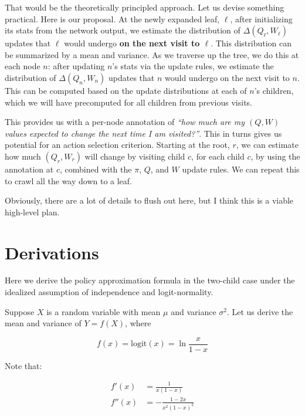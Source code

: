 \documentclass[tikz]{article}
\newcommand{\logit}{\mathrm{logit}}
\begin{document}
That would be the theoretically principled approach. Let us devise something practical. Here is our proposal. At the newly
expanded leaf, $\ell$, after initializing its stats from the network output, we estimate the distribution of $\Delta(Q_\ell, W_\ell)$
updates that $\ell$ would undergo \textbf{on the next visit to $\ell$}. This distribution can be summarized by a mean and variance.
As we traverse up the tree, we do this at each node $n$: after updating $n$'s stats via the update rules, we estimate the
distribution of $\Delta(Q_n, W_n)$ updates that $n$ would undergo on the next visit to $n$. This can be computed
based on the update distributions at each of $n$'s children, which we will have precomputed for all children from
previous visits. \newline

This provides us with a per-node annotation of \textit{``how much are my $(Q, W)$ values expected to change the next time I am visited?''}.
This in turns gives us potential for an action selection criterion. Starting at the root, $r$, we can estimate how much $(Q_r, W_r)$
will change by visiting child $c$, for each child $c$, by using the annotation at $c$, combined with the $\pi$, $Q$, and $W$
update rules. We can repeat this to crawl all the way down to a leaf. \newline

Obviously, there are a lot of details to flush out here, but I think this is a viable high-level plan.


\newpage
\appendix
\renewcommand{\thesection}{Appendix \Alph{section}} %

\section{Derivations}
\label{appendix-derivations}

Here we derive the policy approximation formula in the two-child case under the idealized assumption of independence and logit-normality. \newline

Suppose $X$ is a random variable with mean $\mu$ and variance $\sigma^2$. Let us derive the mean and variance of $Y = f(X)$, where

$$f(x) = \logit(x) = \ln{\frac{x}{1-x}}$$

Note that:

\begin{align*}
f'(x) &= \frac{1}{x(1-x)} \\
f''(x) &= -\frac{1-2x}{x^2(1-x)^2}
\end{align*}
\end{document}
